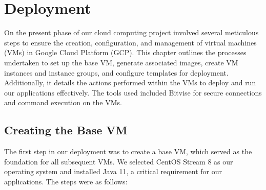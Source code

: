 \chapter{Deployment}\label{ch:deployment}

On the present phase of our cloud computing project involved several meticulous steps to ensure the creation,
configuration, and management of virtual machines (VMs) in Google Cloud Platform (GCP). This chapter outlines
the processes undertaken to set up the base VM, generate associated images, create VM instances and instance groups,
and configure templates for deployment.
Additionally, it details the actions performed within the VMs to deploy and run our applications effectively.
The tools used included Bitvise for secure connections and command execution on the VMs.

\section{Creating the Base VM}\label{sec:creating-the-base-vm}

The first step in our deployment was to create a base VM, which served as the foundation for all subsequent VMs.
We selected CentOS Stream 8 as our operating system and installed Java 11, a critical requirement for our applications.
The steps were as follows:

